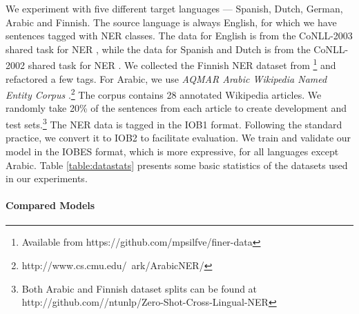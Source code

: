 \documentclass[letterpaper]{article} \usepackage{aaai20}  \usepackage{times}  \usepackage{helvet} \usepackage{courier}  \usepackage[hyphens]{url}  \usepackage{graphicx} \urlstyle{rm} \def\UrlFont{\rm}  \usepackage{graphicx}  \frenchspacing  \setlength{\pdfpagewidth}{8.5in}  \setlength{\pdfpageheight}{11in}
\begin{document}
We experiment with five different target languages --- Spanish, Dutch, German, Arabic and Finnish. The source language is always English, for which we have sentences tagged with NER classes. The data for English is from the CoNLL-2003 shared task for NER \cite{Sang2003IntroductionTT}, while the data for Spanish and Dutch is from the CoNLL-2002 shared task for NER \cite{Sang2002IntroductionTT}. We collected the Finnish NER dataset from \cite{Ruokolainen_2019}\footnote{Available from https://github.com/mpsilfve/finer-data} and refactored a few tags. For Arabic, we use \emph{AQMAR Arabic Wikipedia Named Entity Corpus} \cite{AQMAR}.\footnote{http://www.cs.cmu.edu/~ark/ArabicNER/} The corpus contains 28 annotated Wikipedia articles. We randomly take 20\% of the sentences from each article to create development and test sets.\footnote{Both Arabic and Finnish dataset splits can be found at http://github.com//ntunlp/Zero-Shot-Cross-Lingual-NER} The NER data is tagged in the IOB1 format. Following the standard practice, we convert it to IOB2 to facilitate evaluation.  We train and validate our model in the IOBES format, which is more expressive, for all languages except Arabic.  Table \ref{table:datastats} presents some basic statistics of the datasets used in our experiments.

\begin{table}[t!]
\begin{center}
\caption{Training, Test and Development splits for different datasets. We exclude document start tags (\emph{DOCSTART}).} 
\label{table:datastats}
\end{center}
\end{table}


\paragraph{Compared Models}
\end{document}
